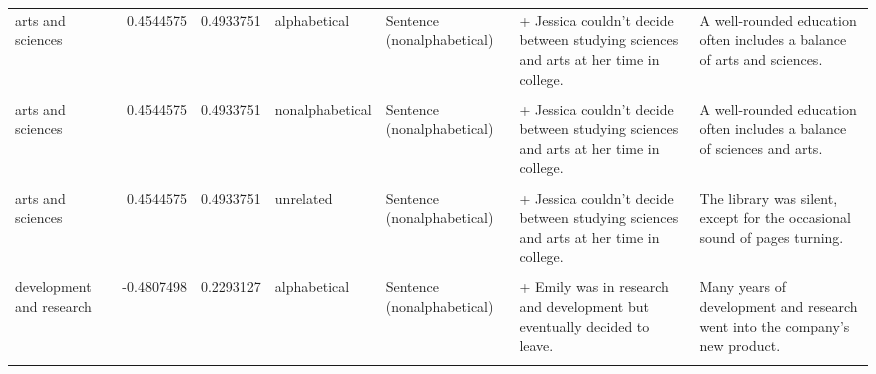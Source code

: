 \documentclass[
  12pt,
]{scrartcl}
\begin{document}
\begin{landscape}
\begin{longtable}{lrrllll}
arts and sciences & 0.4544575 & 0.4933751 & alphabetical & Sentence (nonalphabetical) & + Jessica couldn't decide between studying sciences and arts at her time in  college. & A well-rounded education often includes a balance of arts and sciences.\\
\cellcolor{gray!6}{arts and sciences} & \cellcolor{gray!6}{0.4544575} & \cellcolor{gray!6}{0.4933751} & \cellcolor{gray!6}{nonalphabetical} & \cellcolor{gray!6}{Sentence (alphabetical)} & \cellcolor{gray!6}{+ Jessica couldn't decide between studying arts and sciences at her time in college.} & \cellcolor{gray!6}{A well-rounded education often includes a balance of sciences and arts.}\\
arts and sciences & 0.4544575 & 0.4933751 & nonalphabetical & Sentence (nonalphabetical) & + Jessica couldn't decide between studying sciences and arts at her time in  college. & A well-rounded education often includes a balance of sciences and arts.\\
\cellcolor{gray!6}{arts and sciences} & \cellcolor{gray!6}{0.4544575} & \cellcolor{gray!6}{0.4933751} & \cellcolor{gray!6}{unrelated} & \cellcolor{gray!6}{Sentence (alphabetical)} & \cellcolor{gray!6}{+ Jessica couldn't decide between studying arts and sciences at her time in college.} & \cellcolor{gray!6}{The library was silent, except for the occasional sound of pages turning.}\\
\addlinespace
arts and sciences & 0.4544575 & 0.4933751 & unrelated & Sentence (nonalphabetical) & + Jessica couldn't decide between studying sciences and arts at her time in  college. & The library was silent, except for the occasional sound of pages turning.\\
\cellcolor{gray!6}{development and research} & \cellcolor{gray!6}{-0.4807498} & \cellcolor{gray!6}{0.2293127} & \cellcolor{gray!6}{alphabetical} & \cellcolor{gray!6}{Sentence (alphabetical)} & \cellcolor{gray!6}{+ Emily was in development and research but eventually decided to leave.} & \cellcolor{gray!6}{Many years of development and research went into the company's new product.}\\
development and research & -0.4807498 & 0.2293127 & alphabetical & Sentence (nonalphabetical) & + Emily was in research and development but eventually decided to leave. & Many years of development and research went into the company's new product.\\
\cellcolor{gray!6}{development and research} & \cellcolor{gray!6}{-0.4807498} & \cellcolor{gray!6}{0.2293127} & \cellcolor{gray!6}{nonalphabetical} & \cellcolor{gray!6}{Sentence (alphabetical)} & \cellcolor{gray!6}{+ Emily was in development and research but eventually decided to leave.} & \cellcolor{gray!6}{Many years of research and development went into the company's new product.}\\

\end{longtable}
\end{landscape}
\end{document}
